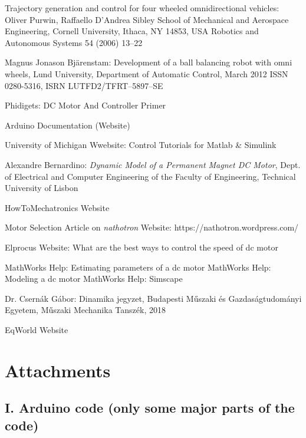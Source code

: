 \documentclass[12pt,english,twoside]{article}
\begin{document}
\begin{thebibliography}{1}
	 Trajectory generation and control for four wheeled omnidirectional vehicles: Oliver Purwin, Raffaello D’Andrea
	Sibley School of Mechanical and Aerospace Engineering, Cornell University, Ithaca, NY 14853, USA
	Robotics and Autonomous Systems 54 (2006) 13–22
	
	 Magnus Jonason Bjärenstam: Development of a ball balancing robot
	with omni wheels, Lund University, Department of Automatic Control,	March 2012
	ISSN 0280-5316,	ISRN LUTFD2/TFRT--5897--SE
	
	 Phidigets: DC Motor And Controller Primer
	
	 Arduino Documentation (Website)
	
	  University of Michigan Wwebsite: Control Tutorials for Matlab \& Simulink
	
	  Alexandre Bernardino: \textit{Dynamic Model of a Permanent Magnet DC Motor}, Dept. of Electrical and Computer Engineering of the Faculty of Engineering, Technical University of Lisbon
	
	 HowToMechatronics Website
	
	 Motor Selection Article on \textit{nathotron} Website: https://nathotron.wordpress.com/
	
	 Elprocus Website: What are the best ways to control the speed of dc motor
	
	 MathWorks Help: Estimating parameters of a dc motor
	 MathWorks Help: Modeling a dc motor
	 MathWorks Help: Simscape
	
	 Dr. Csernák Gábor: Dinamika jegyzet, Budapesti Műszaki és Gazdaságtudományi Egyetem, Műszaki Mechanika Tanszék, 2018
	
	 EqWorld Website
	
	
	
	
\end{thebibliography}
\newpage

\section*{Attachments}
\subsection*{I. Arduino code (only some major parts of the code)}
\end{document}

